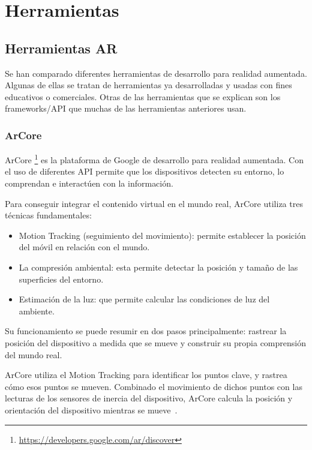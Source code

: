 
\section{Herramientas}
\subsection{Herramientas AR}

Se han comparado diferentes herramientas de desarrollo para realidad aumentada. 
Algunas de ellas se tratan de herramientas ya desarrolladas y usadas con fines educativos o comerciales. Otras de las herramientas que se explican son los frameworks/API que muchas de las herramientas anteriores usan.


\subsubsection{ArCore}

ArCore \footnote{\url{https://developers.google.com/ar/discover}} es la plataforma de Google de desarrollo para realidad aumentada. Con el uso de diferentes API permite que los dispositivos detecten su entorno, lo comprendan e interactúen con la información.

Para conseguir integrar el contenido virtual en el mundo real, ArCore utiliza tres técnicas fundamentales:
\begin{itemize}
	\item Motion Tracking (seguimiento del movimiento): permite establecer la posición del móvil en relación con el mundo.
	\item La compresión ambiental: esta permite detectar la posición y tamaño de las superficies del entorno.
	\item Estimación de la luz: que permite calcular las condiciones de luz del ambiente.
\end{itemize}

Su funcionamiento se puede resumir en dos pasos principalmente: rastrear la posición del dispositivo a medida que se mueve y construir su propia comprensión del mundo real.

ArCore utiliza el Motion Tracking para identificar los puntos clave, y rastrea cómo esos puntos se mueven. Combinado el movimiento de dichos puntos con  las lecturas de los sensores de inercia del dispositivo, ArCore calcula la posición y orientación del dispositivo mientras se mueve~\cite{google}.

